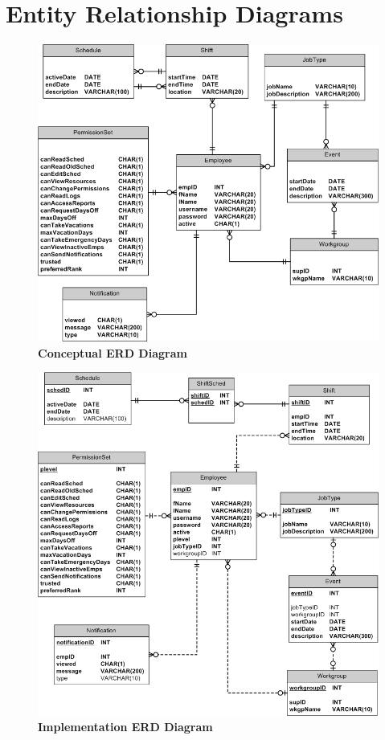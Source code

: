 \documentclass[letterpaper,12pt]{report}
\begin{document}
\section{Entity Relationship Diagrams}
\begin{figure}[ConceptualERD]
 \centering
 \includegraphics[scale=0.6,trim=0mm 10mm 25mm 0mm]{diagrams/WebAgendaERDconceptual.png}
 \caption{\small
\textbf{Conceptual ERD Diagram}}\label{fig:conceptERD}
\end{figure}

\newpage
\begin{figure}[ImplementationERD]
 \centering
 \includegraphics[scale=0.6,trim=20mm 10mm 25mm 0mm]{diagrams/WebAgendaERDimplementation.png}
 \caption{\small
\textbf{Implementation ERD Diagram}}\label{fig:implemERD}
\end{figure}
\end{document}
